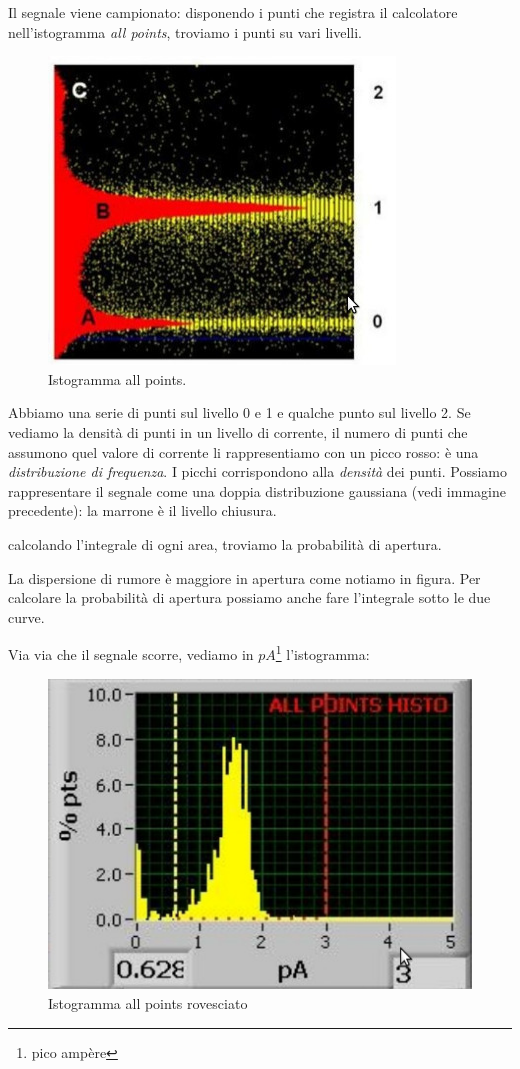 \documentclass[a4paper,12pt]{article}
\begin{document}
Il segnale viene campionato: disponendo i punti che registra il calcolatore nell'istogramma \emph{all points}, troviamo i punti su vari livelli. 
\begin{figure}[H]
\centering
\includegraphics[scale=0.4]{immagine/all.jpg}
\caption{Istogramma all points.}
\end{figure}
Abbiamo una serie di punti sul livello 0 e 1 e qualche punto sul livello 2. Se vediamo la densità di punti in un livello di corrente, il numero di punti che assumono quel valore di corrente li rappresentiamo con un picco rosso: è una \emph{distribuzione di frequenza}. I picchi corrispondono alla \emph{densità} dei punti. Possiamo rappresentare il segnale come una doppia distribuzione gaussiana (vedi immagine precedente): la marrone è il livello chiusura.

calcolando l'integrale di ogni area, troviamo la probabilità di apertura.

La dispersione di rumore è maggiore in apertura come notiamo in figura. Per calcolare la probabilità di apertura possiamo anche fare l'integrale sotto le due curve.

Via via che il segnale scorre, vediamo in $pA$\footnote{pico ampère} l'istogramma:

\begin{figure}[H]
\centering
\includegraphics[scale=0.4]{immagine/giallo.jpg}
\caption{Istogramma all points rovesciato}
\end{figure}
\end{document}
